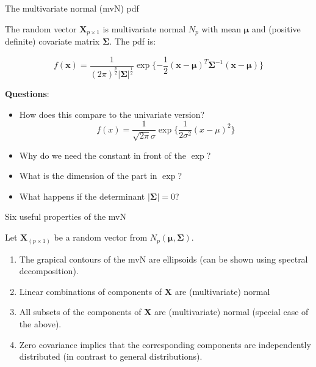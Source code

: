 \documentclass[ignorenonframetext,]{beamer}
\begin{document}
\begin{frame}

\begin{block}{The multivariate normal (mvN) pdf}

\vspace{2mm}

The random vector \(\mathbf{X}_{p\times 1}\) is multivariate normal
\(N_p\) with mean \(\mathbf{\mu}\) and (positive definite) covariate
matrix \(\mathbf\Sigma\). The pdf is:

\[f(\mathbf{x})=\frac{1}{(2\pi)^\frac{p}{2}|\mathbf\Sigma|^\frac{1}{2}} \exp\{-\frac{1}{2}(\mathbf{x}-\mathbf{\mu})^T\mathbf\Sigma^{-1}(\mathbf{x}-\mathbf{\mu})\}\]

\textbf{Questions}:

\begin{itemize}
\item
  How does this compare to the univariate version?
  \[f(x)=\frac{1}{\sqrt{2\pi}\sigma}\exp\{ \frac{1}{2\sigma^2}(x-\mu)^2\}\]
\item
  Why do we need the constant in front of the \(\exp\)?
\item
  What is the dimension of the part in \(\exp\)?
\item
  What happens if the determinant \(|\mathbf\Sigma| = 0\)?
\end{itemize}

\end{block}

\end{frame}

\begin{frame}

\begin{block}{Six useful properties of the mvN}

\vspace{2mm}

Let \(\mathbf{X}_{(p\times 1)}\) be a random vector from
\(N_p(\mathbf{\mu},\mathbf\Sigma)\).

\begin{enumerate}
\def\labelenumi{\arabic{enumi}.}
\item
  The grapical contours of the mvN are ellipsoids (can be shown using
  spectral decomposition).
\item
  Linear combinations of components of \(\mathbf{X}\) are (multivariate)
  normal
\item
  All subsets of the components of \(\mathbf{X}\) are (multivariate)
  normal (special case of the above).
\item
  Zero covariance implies that the corresponding components are
  independently distributed (in contrast to general distributions).
\end{enumerate}

\end{block}

\end{frame}
\end{document}
